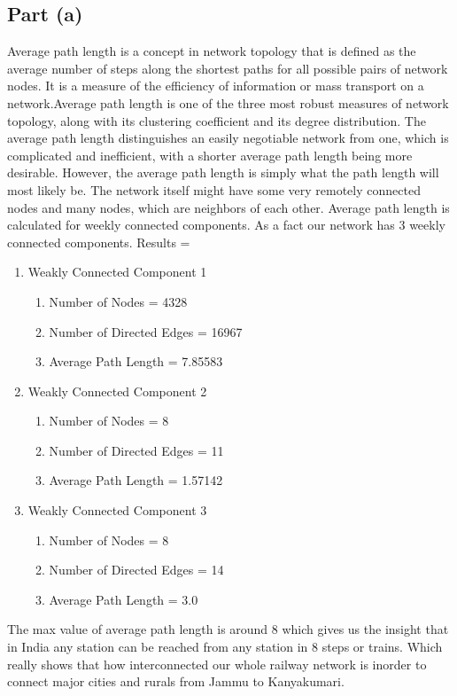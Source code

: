 \documentclass[conference]{IEEEtran}
\begin{document}
\subsection{Part (a)}
Average path length is a concept in network topology that is defined as the average number of steps along the shortest paths for all possible pairs of network nodes. It is a measure of the efficiency of information or mass transport on a network.Average path length is one of the three most robust measures of network topology, along with its clustering coefficient and its degree distribution. The average path length distinguishes an easily negotiable network from one, which is complicated and inefficient, with a shorter average path length being more desirable. However, the average path length is simply what the path length will most likely be. The network itself might have some very remotely connected nodes and many nodes, which are neighbors of each other.
Average path length is calculated for weekly connected components. As a fact our network has 3 weekly connected components.
Results = 
\begin{enumerate}
\item Weakly Connected Component 1
\begin{enumerate}
\item Number of Nodes = 4328
\item Number of Directed Edges = 16967
\item Average Path Length = 7.85583
\end{enumerate}
\item Weakly Connected Component 2
\begin{enumerate}
\item Number of Nodes = 8
\item Number of Directed Edges = 11
\item Average Path Length = 1.57142
\end{enumerate}
\item Weakly Connected Component 3
\begin{enumerate}
\item Number of Nodes = 8
\item Number of Directed Edges = 14
\item Average Path Length = 3.0
\end{enumerate}
\end{enumerate}
The max value of average path length is around 8 which gives us the insight that in India any station can be reached from any station in 8 steps or trains. Which really shows that how interconnected our whole railway network is inorder to connect major cities and rurals from Jammu to Kanyakumari.
\end{document}
